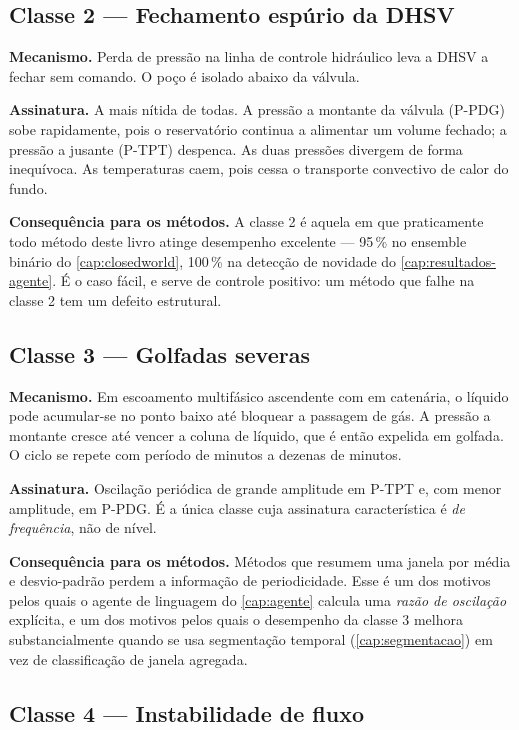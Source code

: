 \subsection{Classe 2 --- Fechamento espúrio da DHSV}

\textbf{Mecanismo.} Perda de pressão na linha de controle hidráulico leva a DHSV a
fechar sem comando. O poço é isolado abaixo da válvula.

\textbf{Assinatura.} A mais nítida de todas. A pressão a montante da válvula (P-PDG)
sobe rapidamente, pois o reservatório continua a alimentar um volume fechado; a pressão
a jusante (P-TPT) despenca. As duas pressões divergem de forma inequívoca. As
temperaturas caem, pois cessa o transporte convectivo de calor do fundo.

\textbf{Consequência para os métodos.} A classe 2 é aquela em que praticamente todo
método deste livro atinge desempenho excelente --- 95\,\% no ensemble binário do
\cref{cap:closedworld}, 100\,\% na detecção de novidade do \cref{cap:resultados-agente}.
É o caso fácil, e serve de controle positivo: um método que falhe na classe 2 tem um
defeito estrutural.

\subsection{Classe 3 --- Golfadas severas}

\textbf{Mecanismo.} Em escoamento multifásico ascendente com  em catenária,
o líquido pode acumular-se no ponto baixo até bloquear a passagem de gás. A pressão a
montante cresce até vencer a coluna de líquido, que é então expelida em golfada. O
ciclo se repete com período de minutos a dezenas de minutos.

\textbf{Assinatura.} Oscilação periódica de grande amplitude em P-TPT e, com menor
amplitude, em P-PDG. É a única classe cuja assinatura característica é \emph{de
frequência}, não de nível.

\textbf{Consequência para os métodos.} Métodos que resumem uma janela por média e
desvio-padrão perdem a informação de periodicidade. Esse é um dos motivos pelos quais
o agente de linguagem do \cref{cap:agente} calcula uma \emph{razão de oscilação}
explícita, e um dos motivos pelos quais o desempenho da classe 3 melhora
substancialmente quando se usa segmentação temporal (\cref{cap:segmentacao}) em vez de
classificação de janela agregada.

\subsection{Classe 4 --- Instabilidade de fluxo}

